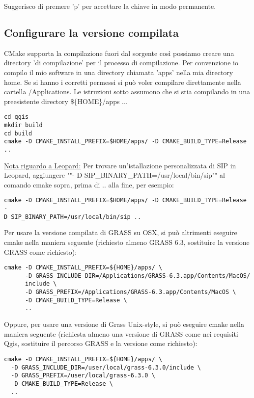 Suggerisco di premere 'p' per accettare la chiave in modo permanente.

\subsection{Configurare la versione compilata}
CMake supporta la compilazione fuori dal sorgente così possiamo creare una directory 'di compilazione' per il processo di compilazione. Per convenzione io compilo il mio software in una directory chiamata 'apps' nella mia directory home. Se si hanno i corretti permessi si può voler compilare direttamente nella cartella /Applications. Le istruzioni sotto assumono che si stia compilando in una preesistente directory \$\{HOME\}/apps ...

\begin{verbatim}
cd qgis
mkdir build
cd build
cmake -D CMAKE_INSTALL_PREFIX=$HOME/apps/ -D CMAKE_BUILD_TYPE=Release ..
\end{verbatim}

\underline{Nota riguardo a Leopard:} Per trovare un'istallazione personalizzata di SIP in Leopard, aggiungere ""-
D SIP\_BINARY\_PATH=/usr/local/bin/sip"" al comando cmake sopra, prima di .. alla fine, per esempio:

\begin{verbatim}
cmake -D CMAKE_INSTALL_PREFIX=$HOME/apps/ -D CMAKE_BUILD_TYPE=Release -
D SIP_BINARY_PATH=/usr/local/bin/sip ..
\end{verbatim}

Per usare la versione compilata di GRASS su OSX, si può altrimenti eseguire cmake nella maniera seguente (richiesto almeno GRASS 6.3, sostituire la versione GRASS come richiesto):

\begin{verbatim}
cmake -D CMAKE_INSTALL_PREFIX=${HOME}/apps/ \
      -D GRASS_INCLUDE_DIR=/Applications/GRASS-6.3.app/Contents/MacOS/
      include \
      -D GRASS_PREFIX=/Applications/GRASS-6.3.app/Contents/MacOS \
      -D CMAKE_BUILD_TYPE=Release \
      ..
\end{verbatim}

Oppure, per usare una versione di Grass Unix-style, si può eseguire cmake nella maniera seguente
(richiesta almeno una versione di GRASS come nei requisiti Qgis, sostituire il percorso GRASS e la versione come richiesto):

\begin{verbatim}
cmake -D CMAKE_INSTALL_PREFIX=${HOME}/apps/ \
  -D GRASS_INCLUDE_DIR=/user/local/grass-6.3.0/include \
  -D GRASS_PREFIX=/user/local/grass-6.3.0 \
  -D CMAKE_BUILD_TYPE=Release \
  ..
\end{verbatim}

